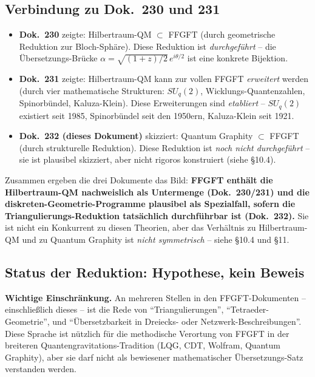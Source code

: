 \subsection{Verbindung zu Dok.~230 und 231}

\begin{itemize}[leftmargin=2em,itemsep=2pt,topsep=2pt]
  \item \textbf{Dok.~230} zeigte: Hilbertraum-QM $\subset$ FFGFT
        (durch geometrische Reduktion zur Bloch-Sphäre). Diese
        Reduktion ist \emph{durchgeführt} -- die
        Übersetzungs-Brücke
        $\alpha = \sqrt{(1+z)/2}\,e^{i\theta/2}$ ist eine konkrete
        Bijektion.
  \item \textbf{Dok.~231} zeigte: Hilbertraum-QM kann zur vollen
        FFGFT \emph{erweitert} werden (durch vier mathematische
        Strukturen: $SU_q(2)$, Wicklungs-Quantenzahlen, Spinorbündel,
        Kaluza-Klein). Diese Erweiterungen sind \emph{etabliert} --
        $SU_q(2)$ existiert seit 1985, Spinorbündel seit den 1950ern,
        Kaluza-Klein seit 1921.
  \item \textbf{Dok.~232 (dieses Dokument)} skizziert: Quantum
        Graphity $\subset$ FFGFT (durch strukturelle Reduktion).
        Diese Reduktion ist \emph{noch nicht durchgeführt} --
        sie ist plausibel skizziert, aber nicht rigoros
        konstruiert (siehe §10.4).
\end{itemize}

Zusammen ergeben die drei Dokumente das Bild: \textbf{FFGFT enthält
die Hilbertraum-QM nachweislich als Untermenge (Dok.~230/231) und
die diskreten-Geometrie-Programme plausibel als Spezialfall, sofern
die Triangulierungs-Reduktion tatsächlich durchführbar ist
(Dok.~232).} Sie ist nicht ein Konkurrent zu diesen Theorien, aber
das Verhältnis zu Hilbertraum-QM und zu Quantum Graphity ist
\emph{nicht symmetrisch} -- siehe §10.4 und §11.

\subsection{Status der Reduktion: Hypothese, kein Beweis}

\textbf{Wichtige Einschränkung.} An mehreren Stellen in den
FFGFT-Dokumenten -- einschließlich dieses -- ist die Rede von
\enquote{Triangulierungen}, \enquote{Tetraeder-Geometrie}, und
\enquote{Übersetzbarkeit in Dreiecks- oder Netzwerk-Beschreibungen}.
Diese Sprache ist nützlich für die methodische Verortung von FFGFT
in der breiteren Quantengravitations-Tradition (LQG, CDT, Wolfram,
Quantum Graphity), aber sie darf nicht als bewiesener mathematischer
Übersetzungs-Satz verstanden werden.

